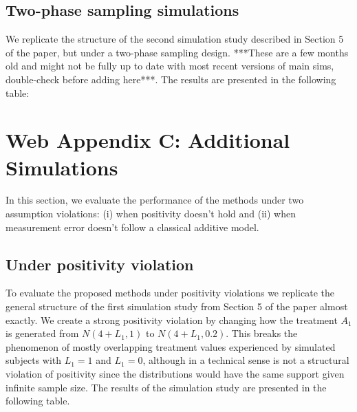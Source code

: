 \documentclass[12pt]{article}
\begin{document}
\subsection{Two-phase sampling simulations}

We replicate the structure of the second simulation study described in Section 5 of the paper, but under a two-phase sampling design. ***These are a few months old and might not be fully up to date with most recent versions of main sims, double-check before adding here***. The results are presented in the following table:

\section{Web Appendix C: Additional Simulations}

In this section, we evaluate the performance of the methods under two assumption violations: (i) when positivity doesn't hold and (ii) when measurement error doesn't follow a classical additive model.

\subsection{Under positivity violation}

To evaluate the proposed methods under positivity violations we replicate the general structure of the first simulation study from Section 5 of the paper almost exactly. We create a strong positivity violation by changing how the treatment $A_{1}$ is generated from $N(4 + L_{1}, 1)$ to $N(4 + L_{1}, 0.2)$. This breaks the phenomenon of mostly overlapping treatment values experienced by simulated subjects with $L_{1} = 1$ and $L_{1} = 0$, although in a technical sense is not a structural violation of positivity since the distributions would have the same support given infinite sample size. The results of the simulation study are presented in the following table.
\end{document}
